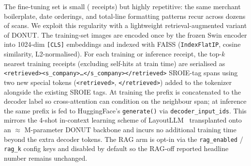 The fine-tuning set is small ( receipts) but highly repetitive:
the same merchant boilerplate, date orderings, and total-line
formatting patterns recur across dozens of scans.  We exploit this
regularity with a lightweight retrieval-augmented variant of DONUT.
The training-set images are encoded once by the frozen Swin encoder
into 1024-dim \texttt{[CLS]} embeddings and indexed with FAISS
(\texttt{IndexFlatIP}, cosine similarity, L2-normalised).  For each
training or inference receipt, the top-$k$ nearest training receipts
(excluding self-hits at train time) are serialised as
\texttt{<retrieved><s\_company>\ldots</s\_company></retrieved>}
SROIE-tag spans using two new special tokens
(\texttt{<retrieved>}, \texttt{</retrieved>}) added to the
tokenizer alongside the existing SROIE tags.  At training the prefix
is concatenated to the decoder label so cross-attention can
condition on the neighbour span; at inference the same prefix is
fed to HuggingFace's \texttt{generate()} via
\texttt{decoder\_input\_ids}.  This mirrors the 4-shot in-context
learning scheme of LayoutLLM~\cite{luo2024layoutllm} transplanted
onto an $\approx$\,\,M-parameter DONUT backbone and incurs no additional training
time beyond the extra decoder tokens.  The RAG arm is opt-in via the
\texttt{rag\_enabled} / \texttt{rag\_k} config keys and disabled by
default so the RAG-off reported headline number remains unchanged.

